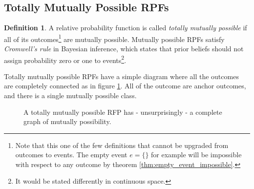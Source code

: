 \documentclass[twoside]{article}
\theoremstyle{plain}%
\theoremstyle{definition}
\newtheorem{definition}{Definition}[section]
\theoremstyle{remark}
\begin{document}
\subsection{Totally Mutually Possible RPFs}

\begin{definition}
\label{def:totally_mutually_possible}
A relative probability function is called \textit{totally mutually possible} if all of its outcomes\footnote{Note that this one of the few definitions that cannot be upgraded from outcomes to events. The empty event \(e = \{\}\) for example will be impossible with respect to any outcome by theorem \ref{thm:empty_event_impossible}.} are mutually possible. Mutually possible RPFs satisfy \textit{Cromwell's rule} in Bayesian inference, which states that prior beliefs should not assign probability zero or one to events\footnote{It would be stated differently in continuous space.}.
\end{definition}

Totally mutually possible RPFs have a simple diagram where all the outcomes are completely connected as in figure \ref{fig:mutually_possible_rpf}. All of the outcome are anchor outcomes, and there is a single mutually possible class.

\begin{figure}[]
\centering
{}
\caption{A totally mutually possible RFP has - unsurprisingly - a complete graph of mutually possibility.}
\label{fig:mutually_possible_rpf}
\end{figure}
\end{document}

